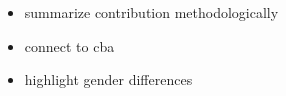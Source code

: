\begin{itemize}
	\item summarize contribution methodologically
	\item connect to cba
	\item highlight gender differences
\end{itemize}